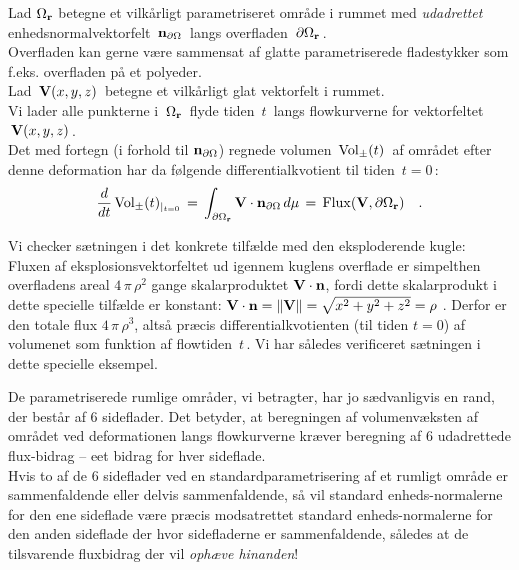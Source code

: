 \begin{theorem} \label{thmGaussFlux}
Lad $\Omega_{\bf{r}}$ betegne et vilkårligt parametriseret område i
rummet med {\em{udadrettet}} enhedsnormalvektorfelt $\,
{\bf{n}}_{\partial \Omega}\, $ langs overfladen $\,\partial
\Omega_{\bf{r}}\,$.\\

Overfladen kan gerne være sammensat af glatte parametriserede fladestykker som f.eks. overfladen på et polyeder.\\

 Lad $\,{\bf{V}}(x,y,z)\,$ betegne et vilkårligt glat
vektorfelt i rummet. \\

Vi lader alle punkterne i $\,\Omega_{\bf{r}}\,$
flyde tiden $\,t\,$ langs flowkurverne for vektorfeltet
$\,{\bf{V}}(x,y,z)\,$. \\

Det med fortegn (i forhold til ${\bf{n}}_{\partial \Omega}$) regnede volumen $\,\operatorname{Vol}_{\pm}(t)\,$ af området efter
denne deformation har da følgende differentialkvotient til tiden
$\,t = 0\,$:
\begin{equation} \label{eqnGaussFlux}
\frac{d}{dt}\operatorname{Vol}_{\pm}(t)_{|_{t=0}} \, = \, \int_{\partial
\Omega_{\bf{r}}}{\bf V}\cdot {\bf n}_{\partial \Omega}\,d\mu \, = \,
\operatorname{Flux}({\bf{V}},
\partial \Omega_{\bf{r}}) \quad .
\end{equation}
\end{theorem}

\begin{example} \label{exampExplodeKugle}
Vi checker sætningen i det konkrete tilfælde med
den eksploderende kugle: Fluxen af
eksplosionsvektorfeltet ud igennem kuglens
overflade er simpelthen overfladens areal
$4\,\pi\,\rho^{2}$ gange skalarproduktet ${\bf
V}\cdot {\bf n}$, fordi dette skalarprodukt i dette
specielle tilfælde er konstant: ${\bf V}\cdot
{\bf n} = \Vert{\bf{V}}\Vert = \sqrt{x^2 + y^2 +
z^2} = \rho\,\,$. Derfor er den totale flux
$4\,\pi\,\rho^{3}$, altså præcis
differentialkvotienten (til tiden $t=0$) af
volumenet som funktion af flowtiden
$\,t\,$. Vi har således verificeret sætningen i
dette specielle eksempel.
\end{example}

\begin{think}
De parametriserede rumlige områder, vi betragter,
har jo sædvanligvis en rand, der består af $6$
sideflader. Det betyder, at beregningen af
volumenvæksten af området ved deformationen langs
flowkurverne kræver beregning af $6$ udadrettede
flux-bidrag -- eet bidrag for hver sideflade.\\

Hvis to af de $6$ sideflader ved en standardparametrisering af et rumligt område
er sammenfaldende eller delvis sammenfaldende,
så vil standard enheds-normalerne for den ene sideflade være præcis modsatrettet
standard enheds-normalerne for den anden sideflade der hvor sidefladerne er sammenfaldende, således at
de tilsvarende fluxbidrag der vil \emph{ophæve hinanden}!
\end{think}




